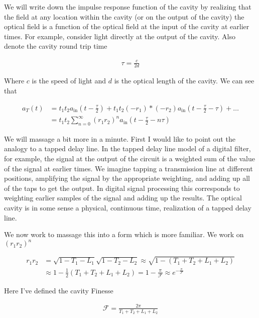 \documentclass[12pt]{article}
\begin{document}
We will write down the impulse response function of the cavity by realizing that the field at any location within the cavity (or on the output of the cavity) the optical field is a function of the optical field at the input of the cavity at earlier times. For example, consider light directly at the output of the cavity. Also denote the cavity round trip time

\begin{align}
\tau = \frac{c}{2d}
\end{align}

Where $c$ is the speed of light and $d$ is the optical length of the cavity. We can see that

\begin{align}
a_T(t) &= t_1t_2a_{\text{in}}\left(t-\frac{\tau}{2}\right) + t_1t_2 (-r_1)*(-r_2) a_{\text{in}}\left(t - \frac{\tau}{2} - \tau\right) + \ldots\\
&=t_1 t_2 \sum_{n=0}^{\infty} (r_1 r_2)^n a_{\text{in}}\left(t- \frac{\tau}{2} - n \tau\right)
\end{align}

 We will massage a bit more in a minute. First I would like to point out the analogy to a tapped delay line. In the tapped delay line model of a digital filter, for example, the signal at the output of the circuit is a weighted sum of the value of the signal at earlier times. We imagine tapping a transmission line at different positions, amplifying the signal by the appropriate weighting, and adding up all of the taps to get the output. In digital signal processing this corresponds to weighting earlier samples of the signal and adding up the results. The optical cavity is in some sense a physical, continuous time, realization of a tapped delay line.

We now work to massage this into a form which is more familiar. We work on $(r_1 r_2)^n$

\begin{align}
r_1r_2 &= \sqrt{1 - T_1 - L_1}\sqrt{1-T_2-L_2} \approx \sqrt{1 - (T_1 + T_2 + L_1 + L_2)}\\
&\approx 1 - \frac{1}{2}(T_1 + T_2 + L_1 + L_2) = 1 - \frac{\pi}{\mathcal{F}} \approx e^{-\frac{\pi}{\mathcal{F}}}
\end{align}

Here I've defined the cavity Finesse

\begin{align}
\mathcal{F} = \frac{2\pi}{T_1 + T_2 + L_1 + L_2}
\end{align}
\end{document}
